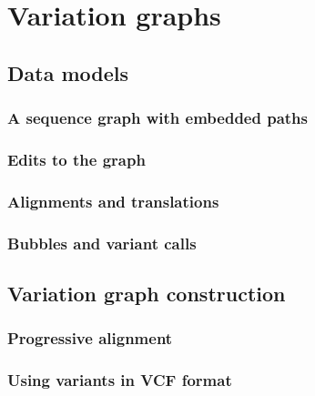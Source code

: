 
\chapter{Variation graphs}

\ifpdf
    \graphicspath{{Chapter2/Figs/Raster/}{Chapter2/Figs/PDF/}{Chapter2/Figs/}}
\else
    \graphicspath{{Chapter2/Figs/Vector/}{Chapter2/Figs/}}
\fi

\section{Data models}

\subsection{A sequence graph with embedded paths}

\subsection{Edits to the graph}

\subsection{Alignments and translations}

\subsection{Bubbles and variant calls}

\section{Variation graph construction}

\subsection{Progressive alignment}

\subsection{Using variants in VCF format}

